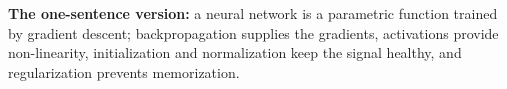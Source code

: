 \begin{InsightBox}
\textbf{The one-sentence version:} a neural network is a parametric function trained by gradient descent; backpropagation supplies the gradients, activations provide non-linearity, initialization and normalization keep the signal healthy, and regularization prevents memorization.
\end{InsightBox}
